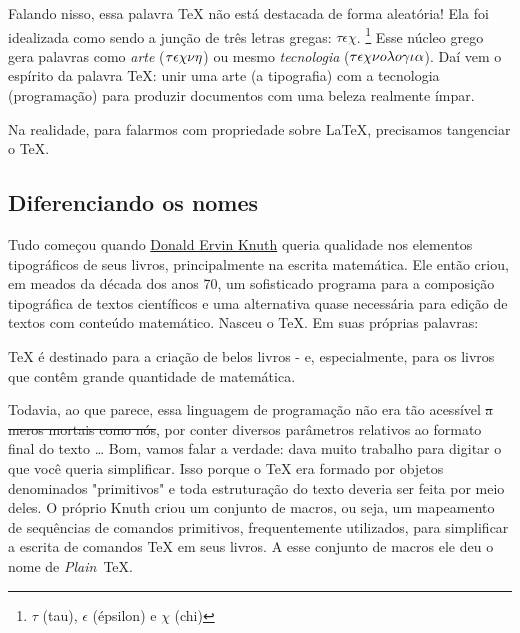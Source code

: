 Falando nisso, essa palavra \TeX{} não está destacada de forma aleatória! 
Ela foi idealizada como sendo a junção de três letras gregas: $\tau\epsilon\chi$.
\footnote{%
  $\tau$ (tau), $\epsilon$ (épsilon) e $\chi$ (chi)
}
Esse núcleo grego gera palavras como \textit{arte} ($\small\tau\epsilon\chi\nu\eta$) 
ou mesmo \textit{tecnologia} ($\small\tau\epsilon\chi\nu o \lambda o \gamma\iota\alpha$).
Daí vem o espírito da palavra \TeX: unir uma arte (a tipografia) com a tecnologia 
(programação) para produzir documentos com uma beleza realmente ímpar.

Na realidade, para falarmos com propriedade sobre \LaTeX, precisamos tangenciar 
o \TeX.

\subsection{Diferenciando os nomes} %

Tudo começou quando \href{https://pt.wikipedia.org/wiki/Donald_Knuth}{Donald Ervin Knuth} 
queria qualidade nos elementos tipográficos de seus livros, principalmente na 
escrita matemática. 
Ele então criou, em meados da década dos anos 70, um sofisticado programa para a 
composição tipográfica de textos científicos e uma alternativa quase necessária 
para edição de textos com conteúdo matemático. 
Nasceu o \TeX. 
Em suas próprias palavras:

\begin{cita}
  \TeX{} é destinado para a criação de belos livros - e, especialmente, para os 
  livros que contêm grande quantidade de matemática.
\end{cita}

Todavia, ao que parece, essa linguagem de programação não era tão acessível 
\sout{a meros mortais como nós}, por conter diversos parâmetros relativos ao 
formato final do texto \ldots
Bom, vamos falar a verdade: dava muito trabalho para digitar o que você queria 
simplificar.
Isso porque o \TeX{} era formado por objetos denominados "primitivos" e toda 
estruturação do texto deveria ser feita por meio deles.
O próprio Knuth criou um conjunto de macros, ou seja, um mapeamento de sequências de comandos primitivos, frequentemente 
utilizados, para simplificar a escrita de comandos \TeX{} em seus livros.
A esse conjunto de macros ele deu o nome de \textit{Plain}~\TeX.

